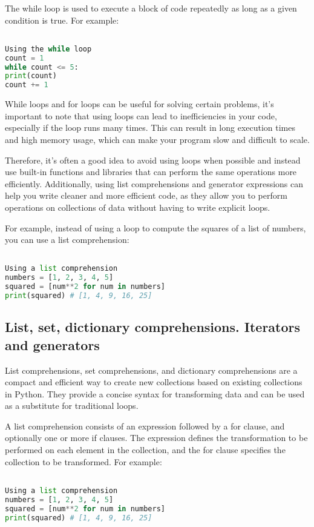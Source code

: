 \documentclass[12pt, a4paper, oneside]{article}
\begin{document}
The while loop is used to execute a block of code repeatedly as long as a given condition is true. For example:

\begin{lstlisting}[language=Python, frame=single]

Using the while loop
count = 1
while count <= 5:
print(count)
count += 1
\end{lstlisting}

While loops and for loops can be useful for solving certain problems, it's important to note that using loops can lead to inefficiencies in your code, especially if the loop runs many times. This can result in long execution times and high memory usage, which can make your program slow and difficult to scale.

Therefore, it's often a good idea to avoid using loops when possible and instead use built-in functions and libraries that can perform the same operations more efficiently. Additionally, using list comprehensions and generator expressions can help you write cleaner and more efficient code, as they allow you to perform operations on collections of data without having to write explicit loops.

For example, instead of using a loop to compute the squares of a list of numbers, you can use a list comprehension:

\begin{lstlisting}[language=Python, frame=single]

Using a list comprehension
numbers = [1, 2, 3, 4, 5]
squared = [num**2 for num in numbers]
print(squared) # [1, 4, 9, 16, 25]
\end{lstlisting}
\subsection{ List, set, dictionary comprehensions. Iterators and generators }
List comprehensions, set comprehensions, and dictionary comprehensions are a compact and efficient way to create new collections based on existing collections in Python. They provide a concise syntax for transforming data and can be used as a substitute for traditional loops.

A list comprehension consists of an expression followed by a for clause, and optionally one or more if clauses. The expression defines the transformation to be performed on each element in the collection, and the for clause specifies the collection to be transformed. For example:

\begin{lstlisting}[language=Python, frame=single]

Using a list comprehension
numbers = [1, 2, 3, 4, 5]
squared = [num**2 for num in numbers]
print(squared) # [1, 4, 9, 16, 25]
\end{lstlisting}
\end{document}
